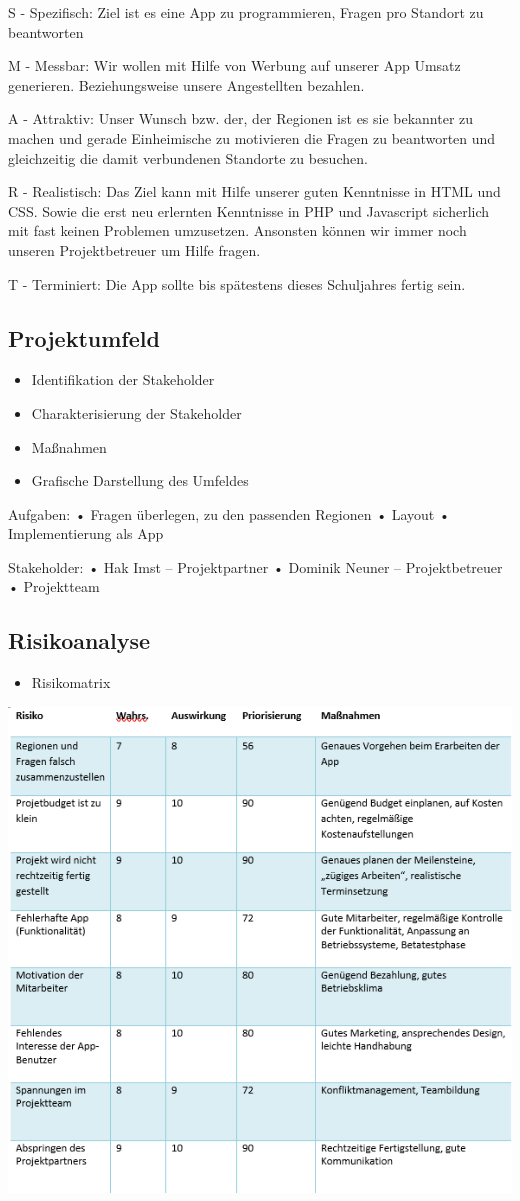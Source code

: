 S - Spezifisch: 
Ziel ist es eine App zu programmieren, Fragen pro Standort zu beantworten

M - Messbar:
Wir wollen mit Hilfe von Werbung auf unserer App Umsatz generieren. Beziehungsweise 
unsere Angestellten bezahlen. 

A - Attraktiv:
Unser Wunsch bzw. der, der Regionen ist es sie bekannter zu machen und gerade Einheimische 
zu motivieren die Fragen zu beantworten und gleichzeitig die damit verbundenen Standorte zu 
besuchen. 

R - Realistisch:
Das Ziel kann mit Hilfe unserer guten Kenntnisse in HTML und CSS. Sowie die erst neu erlernten 
Kenntnisse in PHP und Javascript sicherlich mit fast keinen Problemen umzusetzen. Ansonsten
können wir immer noch unseren Projektbetreuer um Hilfe fragen. 

T - Terminiert:
Die App sollte bis spätestens dieses Schuljahres fertig sein. 

\subsection{Projektumfeld}
\begin{itemize}
	\item Identifikation der Stakeholder
	\item Charakterisierung der Stakeholder
	\item Maßnahmen
	\item Grafische Darstellung des Umfeldes
\end{itemize}
Aufgaben: 
•	Fragen überlegen, zu den passenden Regionen
•	Layout
•	Implementierung als App


Stakeholder:
•	Hak Imst – Projektpartner
•	Dominik Neuner – Projektbetreuer
•	Projektteam 


\subsection{Risikoanalyse}
\begin{itemize}
	\item Risikomatrix
\end{itemize}
\begin{center}
	\includegraphics[width=0.7\linewidth]{risiko}
\end{center}

